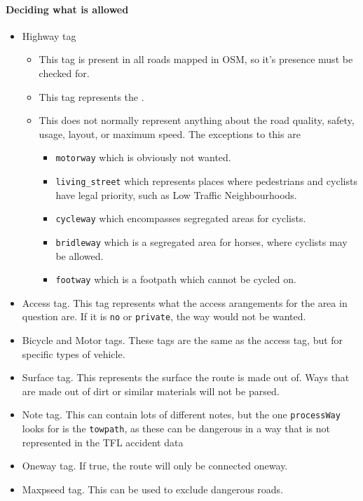 \documentclass[11pt,twoside,a4paper]{report}
\begin{document}
\paragraph{Deciding what is allowed}
\begin{itemize}
    \item Highway tag
    \begin{itemize}
        \item This tag is present in all roads mapped in OSM, so it's presence must be checked for.
        \item This tag represents the \cite{osmhighwayspage}.
        \item This does not normally represent anything about the road quality, safety, usage, layout, or maximum speed. The exceptions to this are
        \begin{itemize}
            \item \texttt{motorway} which is obviously not wanted.
            \item \texttt{living\_street} which represents places where pedestrians and cyclists have legal priority, such as Low Traffic Neighbourhoods.
            \item \texttt{cycleway} which encompasses segregated areas for cyclists. 
            \item \texttt{bridleway} which is a segregated area for horses, where cyclists may be allowed.
            \item \texttt{footway} which is a footpath which cannot be cycled on.
        \end{itemize}
    \end{itemize}
    \item Access tag. This tag represents what the access arangements for the area in question are. If it is \texttt{no} or \texttt{private}, the way would not be wanted.
    \item Bicycle and Motor tags. These tags are the same as the access tag, but for specific types of vehicle.
    \item Surface tag. This represents the surface the route is made out of. Ways that are made out of dirt or similar materials will not be parsed.
    \item Note tag. This can contain lots of different notes, but the one \texttt{processWay} looks for is the \texttt{towpath}, as these can be dangerous in a way that is not represented in the TFL accident data
    \item Oneway tag. If true, the route will only be connected oneway.
    \item Maxpseed tag. This can be used to exclude dangerous roads.
\end{itemize}
\end{document}
